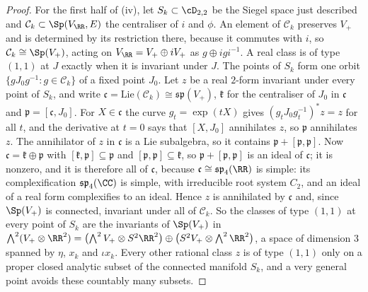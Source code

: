\begin{proof}
For the first half of (iv), let $S_{k}\subset\cD_{2,2}$ be the Siegel space
just described and $\mathcal{C}_{k}\subset\Sp(V_{\RR},E)$ the centraliser of
$i$ and $\phi$. An element of $\mathcal{C}_{k}$ preserves $V_{+}$ and is
determined by its restriction there, because it commutes with $i$, so
$\mathcal{C}_{k}\cong\Sp(V_{+})$, acting on $V_{\RR}=V_{+}\oplus iV_{+}$ as
$g\oplus igi^{-1}$. A real class is of type $(1,1)$ at $J$ exactly when it is
invariant under $J$. The points of $S_{k}$ form one orbit
$\{gJ_{0}g^{-1}:g\in\mathcal{C}_{k}\}$ of a fixed point $J_{0}$. Let $z$ be a
real $2$-form invariant under every point of $S_{k}$, and write
$\mathfrak{c}=\mathrm{Lie}(\mathcal{C}_{k})\cong\mathfrak{sp}(V_{+})$,
$\mathfrak{k}$ for the centraliser of $J_{0}$ in $\mathfrak{c}$ and
$\mathfrak{p}=[\mathfrak{c},J_{0}]$. For $X\in\mathfrak{c}$ the curve
$g_{t}=\exp(tX)$ gives $(g_{t}J_{0}g_{t}^{-1})^{*}z=z$ for all $t$, and the
derivative at $t=0$ says that $[X,J_{0}]$ annihilates $z$, so $\mathfrak{p}$
annihilates $z$. The annihilator of $z$ in $\mathfrak{c}$ is a Lie
subalgebra, so it contains $\mathfrak{p}+[\mathfrak{p},\mathfrak{p}]$. Now
$\mathfrak{c}=\mathfrak{k}\oplus\mathfrak{p}$ with
$[\mathfrak{k},\mathfrak{p}]\subseteq\mathfrak{p}$ and
$[\mathfrak{p},\mathfrak{p}]\subseteq\mathfrak{k}$, so
$\mathfrak{p}+[\mathfrak{p},\mathfrak{p}]$ is an ideal of $\mathfrak{c}$;
it is nonzero, and it is therefore all of $\mathfrak{c}$, because
$\mathfrak{c}\cong\mathfrak{sp}_{4}(\RR)$ is simple: its complexification
$\mathfrak{sp}_{4}(\CC)$ is simple, with irreducible root system $C_{2}$, and
an ideal of a real form complexifies to an ideal. Hence $z$ is annihilated by
$\mathfrak{c}$ and, since $\Sp(V_{+})$ is connected, invariant under all of
$\mathcal{C}_{k}$. So the classes of type $(1,1)$ at every point of $S_{k}$
are the invariants of $\Sp(V_{+})$ in $\bigwedge^{2}(V_{+}\otimes\RR^{2})
=\bigl(\bigwedge^{2}V_{+}\otimes S^{2}\RR^{2}\bigr)
\oplus\bigl(S^{2}V_{+}\otimes\bigwedge^{2}\RR^{2}\bigr)$, a space of dimension
$3$ spanned by $\eta$, $x_{k}$ and $\iota x_{k}$. Every other rational
class $z$ is of type $(1,1)$ only on a proper closed analytic subset of the
connected manifold $S_{k}$, and a very general point avoids these countably
many subsets.


\end{proof}

